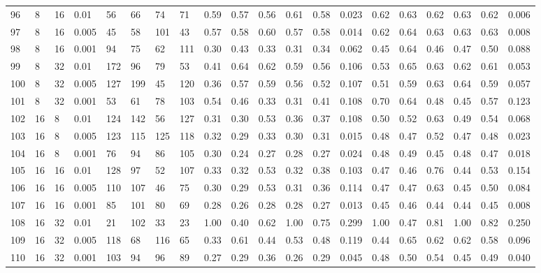 \begin{landscape}
\begin{longtable}{llllllllllllllllllll}
96  & 8  & 16 & 0.01  & 56  & 66  & 74  & 71  & 0.59 & 0.57 & 0.56 & 0.61 & 0.58 & 0.023 & 0.62 & 0.63 & 0.62 & 0.63 & 0.62 & 0.006 \\
97  & 8  & 16 & 0.005 & 45  & 58  & 101 & 43  & 0.57 & 0.58 & 0.60 & 0.57 & 0.58 & 0.014 & 0.62 & 0.64 & 0.63 & 0.63 & 0.63 & 0.008 \\
98  & 8  & 16 & 0.001 & 94  & 75  & 62  & 111 & 0.30 & 0.43 & 0.33 & 0.31 & 0.34 & 0.062 & 0.45 & 0.64 & 0.46 & 0.47 & 0.50 & 0.088 \\
99  & 8  & 32 & 0.01  & 172 & 96  & 79  & 53  & 0.41 & 0.64 & 0.62 & 0.59 & 0.56 & 0.106 & 0.53 & 0.65 & 0.63 & 0.62 & 0.61 & 0.053 \\
100 & 8  & 32 & 0.005 & 127 & 199 & 45  & 120 & 0.36 & 0.57 & 0.59 & 0.56 & 0.52 & 0.107 & 0.51 & 0.59 & 0.63 & 0.64 & 0.59 & 0.057 \\
101 & 8  & 32 & 0.001 & 53  & 61  & 78  & 103 & 0.54 & 0.46 & 0.33 & 0.31 & 0.41 & 0.108 & 0.70 & 0.64 & 0.48 & 0.45 & 0.57 & 0.123 \\
102 & 16 & 8  & 0.01  & 124 & 142 & 56  & 127 & 0.31 & 0.30 & 0.53 & 0.36 & 0.37 & 0.108 & 0.50 & 0.52 & 0.63 & 0.49 & 0.54 & 0.068 \\
103 & 16 & 8  & 0.005 & 123 & 115 & 125 & 118 & 0.32 & 0.29 & 0.33 & 0.30 & 0.31 & 0.015 & 0.48 & 0.47 & 0.52 & 0.47 & 0.48 & 0.023 \\
104 & 16 & 8  & 0.001 & 76  & 94  & 86  & 105 & 0.30 & 0.24 & 0.27 & 0.28 & 0.27 & 0.024 & 0.48 & 0.49 & 0.45 & 0.48 & 0.47 & 0.018 \\
105 & 16 & 16 & 0.01  & 128 & 97  & 52  & 107 & 0.33 & 0.32 & 0.53 & 0.32 & 0.38 & 0.103 & 0.47 & 0.46 & 0.76 & 0.44 & 0.53 & 0.154 \\
106 & 16 & 16 & 0.005 & 110 & 107 & 46  & 75  & 0.30 & 0.29 & 0.53 & 0.31 & 0.36 & 0.114 & 0.47 & 0.47 & 0.63 & 0.45 & 0.50 & 0.084 \\
107 & 16 & 16 & 0.001 & 85  & 101 & 80  & 69  & 0.28 & 0.26 & 0.28 & 0.28 & 0.27 & 0.013 & 0.45 & 0.46 & 0.44 & 0.44 & 0.45 & 0.008 \\
108 & 16 & 32 & 0.01  & 21  & 102 & 33  & 23  & 1.00 & 0.40 & 0.62 & 1.00 & 0.75 & 0.299 & 1.00 & 0.47 & 0.81 & 1.00 & 0.82 & 0.250 \\
109 & 16 & 32 & 0.005 & 118 & 68  & 116 & 65  & 0.33 & 0.61 & 0.44 & 0.53 & 0.48 & 0.119 & 0.44 & 0.65 & 0.62 & 0.62 & 0.58 & 0.096 \\
110 & 16 & 32 & 0.001 & 103 & 94  & 96  & 89  & 0.27 & 0.29 & 0.36 & 0.26 & 0.29 & 0.045 & 0.48 & 0.50 & 0.54 & 0.45 & 0.49 & 0.040 \\

\end{longtable}
\end{landscape}
